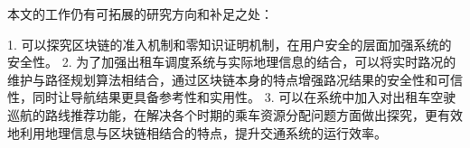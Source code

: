 \begin{conclusion}
本文的工作仍有可拓展的研究方向和补足之处：

1. 可以探究区块链的准入机制和零知识证明机制，在用户安全的层面加强系统的安全性。
2. 为了加强出租车调度系统与实际地理信息的结合，可以将实时路况的维护与路径规划算法相结合，通过区块链本身的特点增强路况结果的安全性和可信性，同时让导航结果更具备参考性和实用性。
3. 可以在系统中加入对出租车空驶巡航的路线推荐功能，在解决各个时期的乘车资源分配问题方面做出探究，更有效地利用地理信息与区块链相结合的特点，提升交通系统的运行效率。





\end{conclusion}